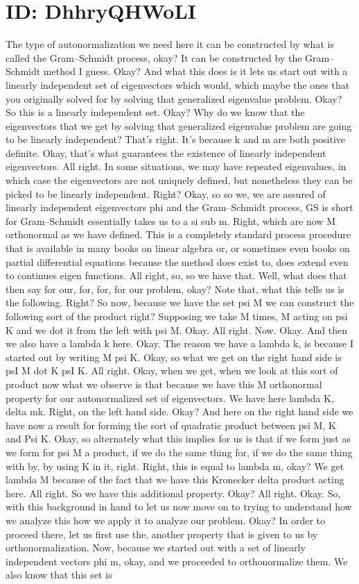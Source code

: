 \documentclass[10pt]{article}
\begin{document}
\section*{ID: DhhryQHWoLI}
The type of autonormalization we need here it can be constructed by what is called the Gram–Schmidt process, okay? It can be constructed by the Gram–Schmidt method I guess. Okay? And what this does is it lets us start out with a linearly independent set of eigenvectors which would, which maybe the ones that you originally solved for by solving that generalized eigenvalue problem. Okay? So this is a linearly independent set. Okay? Why do we know that the eigenvectors that we get by solving that generalized eigenvalue problem are going to be linearly independent? That's right. It's because k and m are both positive definite. Okay, that's what guarantees the existence of linearly independent eigenvectors. All right. In some situations, we may have repeated eigenvalues, in which case the eigenvectors are not uniquely defined, but nonetheless they can be picked to be linearly independent. Right? Okay, so so we, we are assured of linearly independent eigenvectors phi and the Gram–Schmidt process, GS is short for Gram–Schmidt essentially takes us to a si sub m. Right, which are now M orthonormal as we have defined. This is a completely standard process procedure that is available in many books on linear algebra or, or sometimes even books on partial differential equations because the method does exist to, does extend even to continues eigen functions. All right, so, so we have that. Well, what does that then say for our, for, for, for our problem, okay? Note that, what this tells us is the following. Right? So now, because we have the set psi M we can construct the following sort of the product right? Supposing we take M times, M acting on psi K and we dot it from the left with psi M. Okay. All right. Now. Okay. And then we also have a lambda k here. Okay. The reason we have a lambda k, is because I started out by writing M psi K. Okay, so what we get on the right hand side is psI M dot K psI K. All right. Okay, when we get, when we look at this sort of product now what we observe is that because we have this M orthonormal property for our autonormalized set of eigenvectors. We have here lambda K, delta mk. Right, on the left hand side. Okay? And here on the right hand side we have now a result for forming the sort of quadratic product between psi M, K and Psi K. Okay, so alternately what this implies for us is that if we form just as we form for psi M a product, if we do the same thing for, if we do the same thing with by, by using K in it, right. Right, this is equal to lambda m, okay? We get lambda M because of the fact that we have this Kronecker delta product acting here. All right. So we have this additional property. Okay? All right. Okay. So, with this background in hand to let us now move on to trying to understand how we analyze this how we apply it to analyze our problem. Okay? In order to proceed there, let us first use the, another property that is given to us by orthonormalization. Now, because we started out with a set of linearly independent vectors phi m, okay, and we proceeded to orthonormalize them. We also know that this set is 
\end{document}
